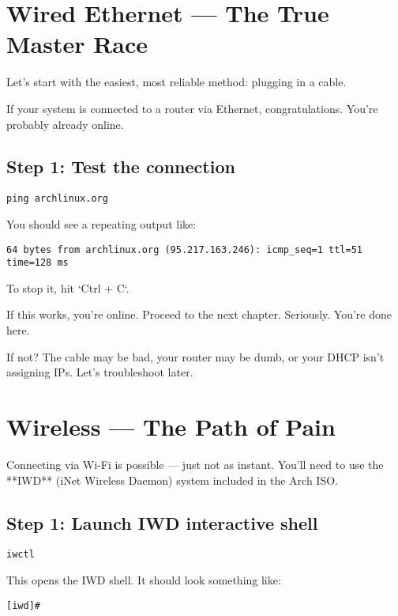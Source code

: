 \documentclass[12pt]{book}
\begin{document}
\section{Wired Ethernet — The True Master Race}

Let’s start with the easiest, most reliable method: plugging in a cable.

If your system is connected to a router via Ethernet, congratulations. You’re probably already online.

\subsection*{Step 1: Test the connection}

\begin{lstlisting}
ping archlinux.org
\end{lstlisting}

You should see a repeating output like:

\begin{lstlisting}
64 bytes from archlinux.org (95.217.163.246): icmp_seq=1 ttl=51 time=128 ms
\end{lstlisting}

To stop it, hit `Ctrl + C`.

If this works, you’re online. Proceed to the next chapter. Seriously. You're done here.

If not? The cable may be bad, your router may be dumb, or your DHCP isn't assigning IPs. Let’s troubleshoot later.

\section{Wireless — The Path of Pain}

Connecting via Wi-Fi is possible — just not as instant. You’ll need to use the **IWD** (iNet Wireless Daemon) system included in the Arch ISO.

\subsection*{Step 1: Launch IWD interactive shell}

\begin{lstlisting}
iwctl
\end{lstlisting}

This opens the IWD shell. It should look something like:

\begin{lstlisting}
[iwd]#
\end{lstlisting}
\end{document}
